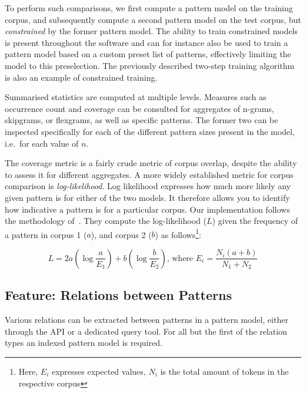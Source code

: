 To perform such comparisons, we first compute a pattern model on the training
corpus, and subsequently compute a second pattern model on the test corpus, but
\emph{constrained} by the former pattern model. The ability to train
constrained models is present throughout the software and can for instance also
be used to train a pattern model based on a custom preset list of patterns,
effectively limiting the model to this preselection. The previously described
two-step training algorithm is also an example of constrained training.

Summarised statistics are computed at multiple levels. Measures such as
occurrence count and coverage can be consulted for aggregates of n-grams,
skipgrams, or flexgrams, as well as specific patterns. The former two can be
inspected specifically for each of the different pattern sizes present in the
model, i.e.\ for each value of $n$.

The coverage metric is a fairly crude metric of corpus overlap, despite the
ability to assess it for different aggregates. A more widely established metric
for corpus comparison is \emph{log-likelihood}. Log likelihood expresses how
much more likely any given pattern is for either of the two models. It
therefore allows you to identify how indicative a pattern is for a particular
corpus. Our implementation follows the methodology
of~\cite{Rayson00comparingcorpora}. They compute the log-likelihood ($L$)
given the frequency of a pattern in corpus 1 ($a$), and corpus 2 ($b$) as
follows\footnote{Here, $E_i$ expresses expected values, $N_i$ is the
total amount of tokens in the respective corpus}:

\begin{equation}
L = 2a(\log \frac{a}{E_1}) + b(\log \frac{b}{E_2})\text{, where } E_i = \frac{N_i(a+b)}{N_1 + N_2}
\end{equation}


\subsection*{Feature: Relations between Patterns}

Various relations can be extracted between patterns in a pattern model, either
through the API or a dedicated query tool. For all but the first of the
relation types an indexed pattern model is required.


